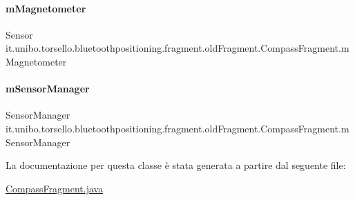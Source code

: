 \hypertarget{classit_1_1unibo_1_1torsello_1_1bluetoothpositioning_1_1fragment_1_1oldFragment_1_1CompassFragment_a9e3cd0081d45a26094a8395fe67736c6_a9e3cd0081d45a26094a8395fe67736c6}{}\label{classit_1_1unibo_1_1torsello_1_1bluetoothpositioning_1_1fragment_1_1oldFragment_1_1CompassFragment_a9e3cd0081d45a26094a8395fe67736c6_a9e3cd0081d45a26094a8395fe67736c6} 
\paragraph{\texorpdfstring{m\+Magnetometer}{mMagnetometer}}
{\footnotesize\ttfamily Sensor it.\+unibo.\+torsello.\+bluetoothpositioning.\+fragment.\+old\+Fragment.\+Compass\+Fragment.\+m\+Magnetometer\hspace{0.3cm}{\ttfamily [private]}}

\hypertarget{classit_1_1unibo_1_1torsello_1_1bluetoothpositioning_1_1fragment_1_1oldFragment_1_1CompassFragment_a9006c75f41300481eaa95c6bb02143e3_a9006c75f41300481eaa95c6bb02143e3}{}\label{classit_1_1unibo_1_1torsello_1_1bluetoothpositioning_1_1fragment_1_1oldFragment_1_1CompassFragment_a9006c75f41300481eaa95c6bb02143e3_a9006c75f41300481eaa95c6bb02143e3} 
\paragraph{\texorpdfstring{m\+Sensor\+Manager}{mSensorManager}}
{\footnotesize\ttfamily Sensor\+Manager it.\+unibo.\+torsello.\+bluetoothpositioning.\+fragment.\+old\+Fragment.\+Compass\+Fragment.\+m\+Sensor\+Manager\hspace{0.3cm}{\ttfamily [private]}}



La documentazione per questa classe è stata generata a partire dal seguente file\+:\begin{DoxyCompactItemize}
\item 
\hyperlink{CompassFragment_8java}{Compass\+Fragment.\+java}\end{DoxyCompactItemize}
